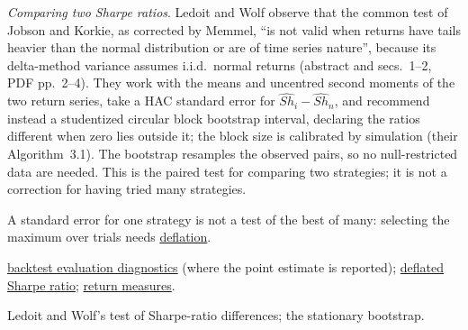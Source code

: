 \begin{qfmethod}
\emph{Comparing two Sharpe ratios}. Ledoit and Wolf observe that the common test of Jobson and Korkie, as corrected by Memmel, ``is not valid when returns have tails heavier than the normal distribution or are of time series nature'', because its delta-method variance assumes i.i.d.\ normal returns (abstract and secs.~1--2, PDF pp.~2--4). They work with the means and uncentred second moments of the two return series, take a HAC standard error for $\widehat{Sh}_i-\widehat{Sh}_n$, and recommend instead a studentized circular block bootstrap interval, declaring the ratios different when zero lies outside it; the block size is calibrated by simulation (their Algorithm~3.1). The bootstrap resamples the observed pairs, so no null-restricted data are needed. This is the paired test for comparing two strategies; it is not a correction for having tried many strategies.

 A standard error for one strategy is not a test of the best of many: selecting the maximum over trials needs \hyperref[meth:deflated-sharpe-ratio]{deflation}.

 \hyperref[meth:backtest-evaluation-diagnostics]{backtest evaluation diagnostics} (where the point estimate is reported); \hyperref[meth:deflated-sharpe-ratio]{deflated Sharpe ratio}; \hyperref[def:return-measures]{return measures}.

 Ledoit and Wolf's test of Sharpe-ratio differences; the stationary bootstrap.

\end{qfmethod}


